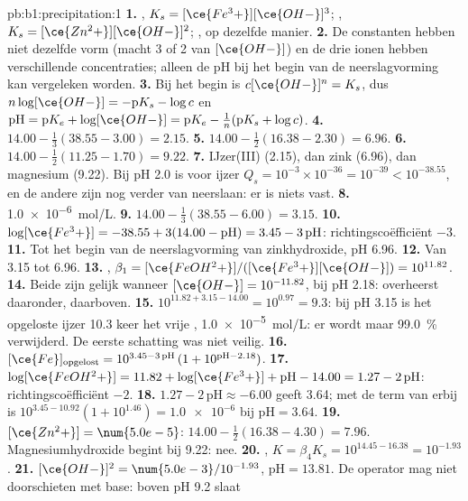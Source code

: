 \begin{solution}{pb:b1:precipitation:1}
\textbf{1.} , $K_s = [\ce{Fe^3+}][\ce{OH-}]^3$;
, $K_s = [\ce{Zn^2+}][\ce{OH-}]^2$;
, op dezelfde manier.
\textbf{2.} De constanten hebben niet dezelfde vorm (macht 3 of 2 van
$[\ce{OH-}]$) en de drie ionen hebben verschillende concentraties; alleen
de pH bij het begin van de neerslagvorming kan vergeleken worden.
\textbf{3.} Bij het begin is $c[\ce{OH-}]^n = K_s$, dus $n\log[\ce{OH-}] =
-\mathrm{p}K_s - \log c$ en $\mathrm{pH} = \mathrm{p}K_e +
\log[\ce{OH-}] = \mathrm{p}K_e - \frac1n(\mathrm{p}K_s + \log c)$.
\textbf{4.} $14.00 - \frac13(38.55 - 3.00) = 2.15$.
\textbf{5.} $14.00 - \frac12(16.38 - 2.30) = 6.96$.
\textbf{6.} $14.00 - \frac12(11.25 - 1.70) = 9.22$.
\textbf{7.} IJzer(III) (2.15), dan zink (6.96), dan magnesium (9.22). Bij
pH 2.0 is voor ijzer $Q_s = 10^{-3} \times 10^{-36} = 10^{-39} < 10^{-38.55}$,
en de andere zijn nog verder van neerslaan: er is niets vast.
\textbf{8.} \qty{1.0e-6}{mol/L}.
\textbf{9.} $14.00 - \frac13(38.55 - 6.00) = 3.15$.
\textbf{10.} $\log[\ce{Fe^3+}] = -38.55 + 3(14.00 - \mathrm{pH}) = 3.45 -
3\,\mathrm{pH}$: richtingscoëfficiënt $-3$.
\textbf{11.} Tot het begin van de neerslagvorming van zinkhydroxide, pH
6.96.
\textbf{12.} Van 3.15 tot 6.96.
\textbf{13.} , $\beta_1 =
[\ce{FeOH^2+}]/([\ce{Fe^3+}][\ce{OH-}]) = 10^{11.82}$.
\textbf{14.} Beide zijn gelijk wanneer $[\ce{OH-}] = 10^{-11.82}$, bij pH
2.18:  overheerst daaronder,  daarboven.
\textbf{15.} $10^{11.82 + 3.15 - 14.00} = 10^{0.97} = 9.3$: bij pH 3.15 is
het opgeloste ijzer 10.3 keer het vrije , \qty{1.0e-5}{mol/L}:
er wordt maar \qty{99.0}{\percent} verwijderd. De eerste schatting was
niet veilig.
\textbf{16.} $[\ce{Fe}]_{\mathrm{opgelost}} = 10^{3.45 - 3\,\mathrm{pH}}\,
(1 + 10^{\mathrm{pH} - 2.18})$.
\textbf{17.} $\log[\ce{FeOH^2+}] = 11.82 + \log[\ce{Fe^3+}] + \mathrm{pH} -
14.00 = 1.27 - 2\,\mathrm{pH}$: richtingscoëfficiënt $-2$.
\textbf{18.} $1.27 - 2\,\mathrm{pH} \approx -6.00$ geeft 3.64; met de
term van  erbij is $10^{3.45 - 10.92}(1 + 10^{1.46}) =
\num{1.0e-6}$ bij $\mathrm{pH} = 3.64$.
\textbf{19.} $[\ce{Zn^2+}] = \num{5.0e-5}$: $14.00 - \frac12(16.38 - 4.30) =
7.96$. Magnesiumhydroxide begint bij 9.22: nee.
\textbf{20.} , $K = \beta_4 K_s =
10^{14.45 - 16.38} = 10^{-1.93}$.
\textbf{21.} $[\ce{OH-}]^2 = \num{5.0e-3}/10^{-1.93}$, $\mathrm{pH} =
13.81$. De operator mag niet doorschieten met base: boven pH 9.2 slaat

\end{solution}
